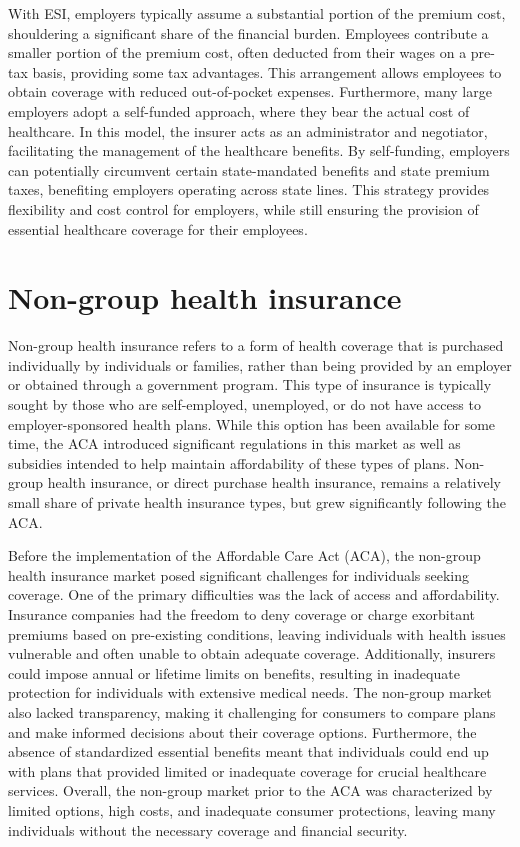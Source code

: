 \documentclass[
  letterpaper,
  DIV=11,
  numbers=noendperiod]{scrreport}
\theoremstyle{definition}
\theoremstyle{remark}
\begin{document}
With ESI, employers typically assume a substantial portion of the
premium cost, shouldering a significant share of the financial burden.
Employees contribute a smaller portion of the premium cost, often
deducted from their wages on a pre-tax basis, providing some tax
advantages. This arrangement allows employees to obtain coverage with
reduced out-of-pocket expenses. Furthermore, many large employers adopt
a self-funded approach, where they bear the actual cost of healthcare.
In this model, the insurer acts as an administrator and negotiator,
facilitating the management of the healthcare benefits. By self-funding,
employers can potentially circumvent certain state-mandated benefits and
state premium taxes, benefiting employers operating across state lines.
This strategy provides flexibility and cost control for employers, while
still ensuring the provision of essential healthcare coverage for their
employees.

\hypertarget{non-group-health-insurance}{%
\section{Non-group health insurance}\label{non-group-health-insurance}}

Non-group health insurance refers to a form of health coverage that is
purchased individually by individuals or families, rather than being
provided by an employer or obtained through a government program. This
type of insurance is typically sought by those who are self-employed,
unemployed, or do not have access to employer-sponsored health plans.
While this option has been available for some time, the ACA introduced
significant regulations in this market as well as subsidies intended to
help maintain affordability of these types of plans. Non-group health
insurance, or direct purchase health insurance, remains a relatively
small share of private health insurance types, but grew significantly
following the ACA.

Before the implementation of the Affordable Care Act (ACA), the
non-group health insurance market posed significant challenges for
individuals seeking coverage. One of the primary difficulties was the
lack of access and affordability. Insurance companies had the freedom to
deny coverage or charge exorbitant premiums based on pre-existing
conditions, leaving individuals with health issues vulnerable and often
unable to obtain adequate coverage. Additionally, insurers could impose
annual or lifetime limits on benefits, resulting in inadequate
protection for individuals with extensive medical needs. The non-group
market also lacked transparency, making it challenging for consumers to
compare plans and make informed decisions about their coverage options.
Furthermore, the absence of standardized essential benefits meant that
individuals could end up with plans that provided limited or inadequate
coverage for crucial healthcare services. Overall, the non-group market
prior to the ACA was characterized by limited options, high costs, and
inadequate consumer protections, leaving many individuals without the
necessary coverage and financial security.
\end{document}

